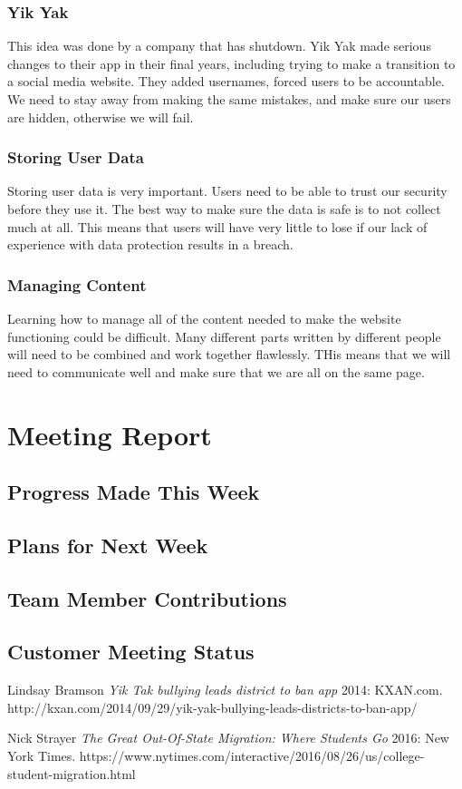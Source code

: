 \documentclass[12pt]{article}
\begin{document}
\subsubsection{Yik Yak}
	This idea was done by a company that has shutdown. Yik Yak made serious changes to their app in their final years, including trying to make a transition to a social media website. They added usernames, forced users to be accountable. We need to stay away from making the same mistakes, and make sure our users are hidden, otherwise we will fail.
\subsubsection{Storing User Data}
	Storing user data is very important. Users need to be able to trust our security before they use it. The best way to make sure the data is safe is to not collect much at all. This means that users will have very little to lose if our lack of experience with data protection results in a breach.
\subsubsection{Managing Content}
	Learning how to manage all of the content needed to make the website functioning could be difficult. Many different parts written by different people will need to be combined and work together flawlessly. THis means that we will need to communicate well and make sure that we are all on the same page.


\section{Meeting Report}

\subsection{Progress Made This Week}
\subsection{Plans for Next Week}
\subsection{Team Member Contributions}
\subsection{Customer Meeting Status}

\newpage
  \begin{thebibliography}{1}

   Lindsay Bramson {\em Yik Tak bullying leads district to ban app}  2014: KXAN.com. http://kxan.com/2014/09/29/yik-yak-bullying-leads-districts-to-ban-app/

    Nick Strayer {\em The Great Out-Of-State Migration: Where Students Go} 2016:
  New York Times. https://www.nytimes.com/interactive/2016/08/26/us/college-student-migration.html

  \end{thebibliography}
\end{document}
